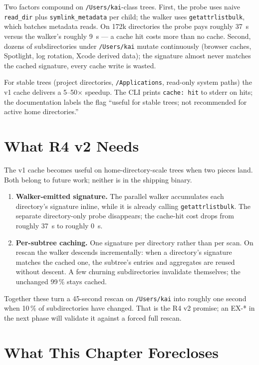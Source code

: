 Two factors compound on \texttt{/Users/kai}-class trees. First, the
probe uses naive \texttt{read\_dir} plus \texttt{symlink\_metadata}
per child; the walker uses \texttt{getattrlistbulk}, which batches
metadata reads. On 172k directories the probe pays roughly 37~s
versus the walker's roughly 9~s --- a cache hit costs more than no
cache. Second, dozens of subdirectories under \texttt{/Users/kai}
mutate continuously (browser caches, Spotlight, log rotation, Xcode
derived data); the signature almost never matches the cached
signature, every cache write is wasted.

For stable trees (project directories, \texttt{/Applications},
read-only system paths) the v1 cache delivers a 5--50$\times$
speedup. The CLI prints \texttt{cache: hit} to stderr on hits; the
documentation labels the flag ``useful for stable trees; not
recommended for active home directories.''

\section{What R4 v2 Needs}

The v1 cache becomes useful on home-directory-scale trees when two
pieces land. Both belong to future work; neither is in the shipping
binary.

\begin{enumerate}
  \item \textbf{Walker-emitted signature.} The parallel walker
    accumulates each directory's signature inline, while it is
    already calling \texttt{getattrlistbulk}. The separate
    directory-only probe disappears; the cache-hit cost drops from
    roughly 37~s to roughly 0~s.
  \item \textbf{Per-subtree caching.} One signature per directory
    rather than per scan. On rescan the walker descends
    incrementally: when a directory's signature matches the
    cached one, the subtree's entries and aggregates are reused
    without descent. A few churning subdirectories invalidate
    themselves; the unchanged 99\,\% stays cached.
\end{enumerate}

Together these turn a 45-second rescan on \texttt{/Users/kai} into
roughly one second when 10\,\% of subdirectories have changed.
That is the R4 v2 promise; an EX-* in the next phase will validate
it against a forced full rescan.

\section{What This Chapter Forecloses}

